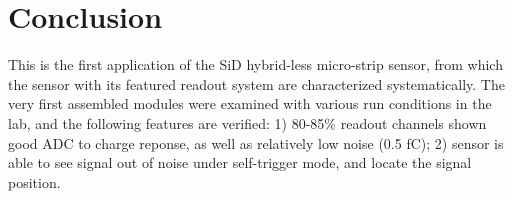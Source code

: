\documentclass[conference]{IEEEtran}
\def\lycoris{\textsc{Lycoris }}%
\begin{document}
%





\section{Conclusion}

This is the first application of the SiD hybrid-less micro-strip sensor, from which the sensor with its featured readout system are characterized systematically.
The very first assembled modules were examined with various run conditions in the lab, and the following features are verified:
1) 80-85\% readout channels shown good ADC to charge reponse, as well as relatively low noise (0.5 fC);
2) sensor is able to see signal out of noise under self-trigger mode, and locate the signal position.
\end{document}
